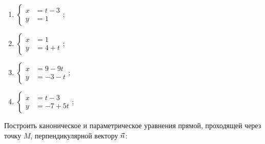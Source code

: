 	\vspace{10pt}
	\begin{multicols}{2}
		\begin{enumerate}
			\setcounter{enumi}{\value{tasks}}

				\item \( \displaystyle \left\lbrace \begin{aligned}
							x &= t - 3 \\
							y &= 1
						\end{aligned} \right. \);
				\item \( \displaystyle \left\lbrace \begin{aligned}
							x &= 1 \\
							y &= 4 + t
						\end{aligned} \right. \);
				\item \( \displaystyle \left\lbrace \begin{aligned}
							x &= 9 - 9t \\
							y &= -3 - t
						\end{aligned} \right. \);
				\item \( \displaystyle \left\lbrace \begin{aligned}
							x &= t - 3 \\
							y &= -7 + 5t
						\end{aligned} \right. \);

			\setcounter{tasks}{\value{enumi}}
		\end{enumerate}
	\end{multicols}

	\vspace{15pt}
	Построить каноническое и параметрическое уравнения прямой, проходящей через точку $M$, перпендикулярной вектору $\vec{n}$:


